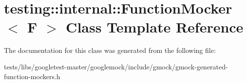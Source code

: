 \hypertarget{classtesting_1_1internal_1_1FunctionMocker}{}\section{testing\+:\+:internal\+:\+:Function\+Mocker$<$ F $>$ Class Template Reference}
\label{classtesting_1_1internal_1_1FunctionMocker}


The documentation for this class was generated from the following file\+:\begin{DoxyCompactItemize}
\item 
tests/libs/googletest-\/master/googlemock/include/gmock/gmock-\/generated-\/function-\/mockers.\+h\end{DoxyCompactItemize}
